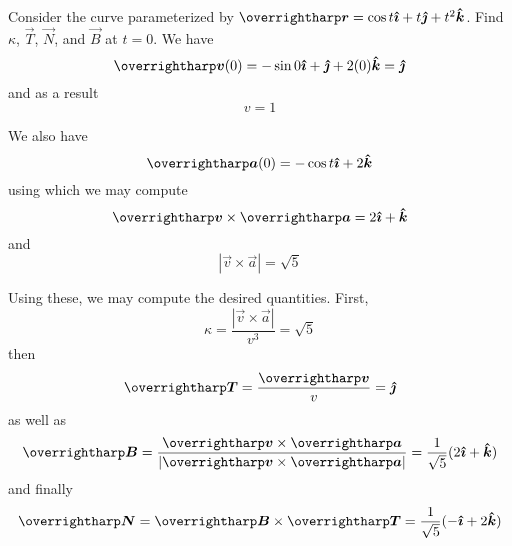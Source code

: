 \documentclass[../main.tex]{subfiles}
\begin{document}
        \begin{example}{}{}
                Consider the curve parameterized by \(\vec{r}=\cos{t}\i+t\j+t^2\k\). Find \(\kappa\), \(\vec{T}\), \(\vec{N}\), and \(\vec{B}\) at \(t=0\).
                \tcblower
                We have
                \[
                \vec{v}(0)=-\sin{0}\i+\j+2(0)\k=\j
                \]
                and as a result
                \[
                v=1
                \]

                We also have
                \[
                \vec{a}(0)=-\cos{t}\i+2\k
                \]
                using which we may compute
                \[
                \vec{v}\times\vec{a}=2\i+\k
                \]
                and
                \[
                |\vec{v}\times\vec{a}|=\sqrt{5}
                \]

                Using these, we may compute the desired quantities. First,
                \[
                \kappa=\frac{|\vec{v}\times\vec{a}|}{v^3}=\sqrt{5}
                \]
                then
                \[
                \vec{T}=\frac{\vec{v}}{v}=\j
                \]
                as well as
                \[
                \vec{B}=\frac{\vec{v}\times\vec{a}}{|\vec{v}\times\vec{a}|}=\frac{1}{\sqrt{5}}(2\i+\k)
                \]
                and finally
                \[
                \vec{N}=\vec{B}\times\vec{T}=\frac{1}{\sqrt{5}}(-\i+2\k)
                \]
        \end{example}
\end{document}
